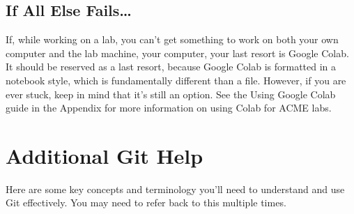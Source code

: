 \subsection*{If All Else Fails\dots}
If, while working on a lab, you can't get something to work on 
\ifbyu
both your own computer and the lab machine,
\else 
your computer,
\fi
your last resort is Google Colab.
It should be reserved as a last resort, because Google Colab is formatted in a notebook style, which is fundamentally different than a  file.
However, if you are ever stuck, keep in mind that it's still an option.
See the Using Google Colab guide in the Appendix for more information on using Colab for ACME labs.
\fi


\ifbootcamp
\section*{Additional Git Help}
Here are some key concepts and terminology you'll need to understand and use Git effectively.
You may need to refer back to this multiple times.
